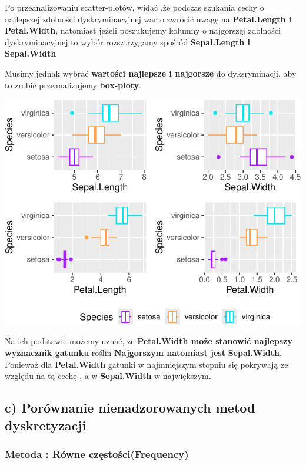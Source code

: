 \documentclass[
  12pt,
]{article}
\begin{document}
Po przeanalizowaniu scatter-plotów, widać ,że podczas szukania cechy o
najlepszej zdolności dyskryminacyjnej warto zwrócić uwagę na
\textbf{Petal.Length i Petal.Width}, natomiast jeżeli poszukujemy
kolumny o najgorszej zdolności dyskryminacyjnej to wybór rozsztrzygamy
spośród \textbf{Sepal.Length i Sepal.Width}

Musimy jednak wybrać \textbf{wartości najlepsze i najgorsze} do
dyksryminacji, aby to zrobić przeanalizujemy \textbf{box-ploty}.

\begin{center}\includegraphics{Sprawozdanie2_files/figure-latex/zad1b2-1} \end{center}

Na ich podstawie możemy uznać, że \textbf{Petal.Width może stanowić
najlepszy wyznacznik gatunku} roślin \textbf{Najgorszym natomiast jest}
\textbf{Sepal.Width}. Ponieważ dla \textbf{Petal.Width} gatunki w
najmniejszym stopniu się pokrywają ze względu na tą cechę , a w
\textbf{Sepal.Width} w największym.

\subsection{c) Porównanie nienadzorowanych metod
dyskretyzacji}\label{c-poruxf3wnanie-nienadzorowanych-metod-dyskretyzacji}

\subsubsection{Metoda : Równe
częstości(Frequency)}\label{metoda-ruxf3wne-czux119stoux15bcifrequency}
\end{document}
